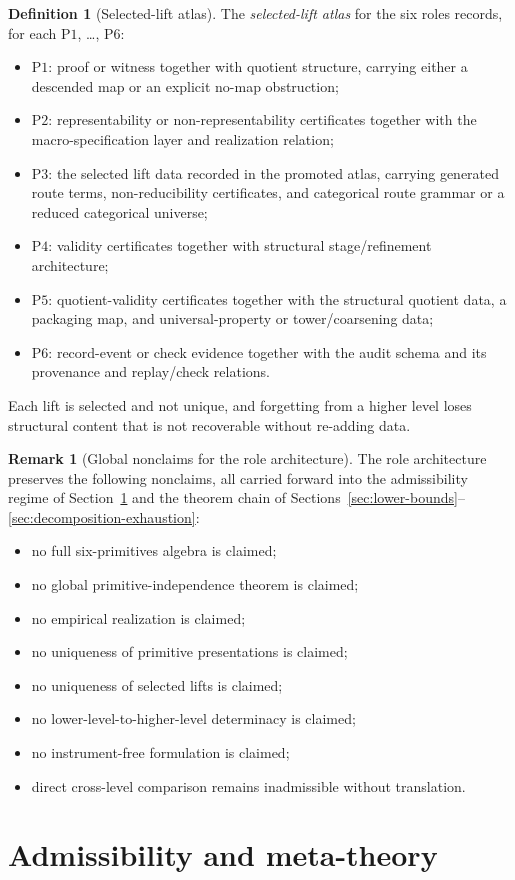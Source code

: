 \documentclass[11pt]{article}
\theoremstyle{definition}
\newtheorem{definition}[theorem]{Definition}
\newtheorem{remark}[theorem]{Remark}
\newcommand{\Pone}{\ensuremath{\mathrm{P1}}}
\newcommand{\Ptwo}{\ensuremath{\mathrm{P2}}}
\newcommand{\Pthree}{\ensuremath{\mathrm{P3}}}
\newcommand{\Pfour}{\ensuremath{\mathrm{P4}}}
\newcommand{\Pfive}{\ensuremath{\mathrm{P5}}}
\newcommand{\Psix}{\ensuremath{\mathrm{P6}}}
\begin{document}
\begin{definition}[Selected-lift atlas]\label{def:selected-lift-atlas}
The \emph{selected-lift atlas} for the six roles records, for each
\Pone{}, \ldots, \Psix{}:
\begin{itemize}[topsep=2pt,itemsep=1pt]
  \item \Pone{}: proof or witness together with quotient structure, carrying
    either a descended map or an explicit no-map obstruction;
  \item \Ptwo{}: representability or non-representability certificates
    together with the macro-specification layer and realization relation;
  \item \Pthree{}: the selected lift data recorded in the promoted atlas,
    carrying generated route terms, non-reducibility certificates, and
    categorical route grammar or a reduced categorical universe;
  \item \Pfour{}: validity certificates together with structural
    stage/refinement architecture;
  \item \Pfive{}: quotient-validity certificates together with the
    structural quotient data, a packaging map, and universal-property or
    tower/coarsening data;
  \item \Psix{}: record-event or check evidence together with the audit
    schema and its provenance and replay/check relations.
\end{itemize}
Each lift is selected and not unique, and forgetting from a higher level
loses structural content that is not recoverable without re-adding data.
\end{definition}

\begin{remark}[Global nonclaims for the role architecture]\label{rem:atlas-global-nonclaims}
The role architecture preserves the following nonclaims, all carried
forward into the admissibility regime of
Section~\ref{sec:admissibility-meta-theory} and the theorem chain of
Sections~\ref{sec:lower-bounds}--\ref{sec:decomposition-exhaustion}:
\begin{itemize}[topsep=2pt,itemsep=1pt]
  \item no full six-primitives algebra is claimed;
  \item no global primitive-independence theorem is claimed;
  \item no empirical realization is claimed;
  \item no uniqueness of primitive presentations is claimed;
  \item no uniqueness of selected lifts is claimed;
  \item no lower-level-to-higher-level determinacy is claimed;
  \item no instrument-free formulation is claimed;
  \item direct cross-level comparison remains inadmissible without
    translation.
\end{itemize}
\end{remark} \section{Admissibility and meta-theory}\label{sec:admissibility-meta-theory}
\end{document}
